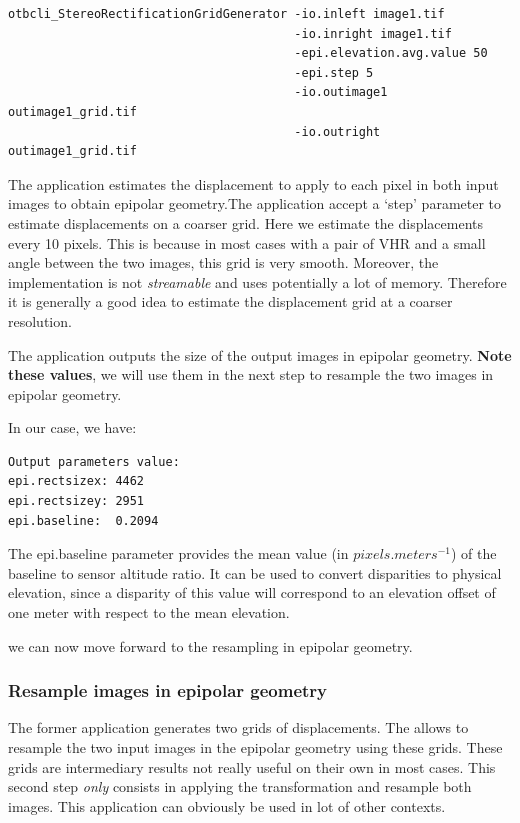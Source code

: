 \begin{verbatim}
otbcli_StereoRectificationGridGenerator -io.inleft image1.tif
                                        -io.inright image1.tif
                                        -epi.elevation.avg.value 50
                                        -epi.step 5
                                        -io.outimage1 outimage1_grid.tif
                                        -io.outright outimage1_grid.tif
\end{verbatim}

The application estimates the displacement to apply to each pixel in
both input images to obtain epipolar geometry.The application accept a
`step' parameter to estimate displacements on a coarser grid. Here we
estimate the displacements every 10 pixels. This is because in most
cases with a pair of VHR and a small angle between the two images,
this grid is very smooth. Moreover, the implementation is
not \textit{streamable} and uses potentially a lot of
memory. Therefore it is generally a good idea to estimate the
displacement grid at a coarser resolution.

The application outputs the size of the output images in epipolar
geometry. \textbf{Note these values}, we will use them in the next step to
resample the two images in epipolar geometry.

In our case, we have:

\begin{verbatim}
Output parameters value:
epi.rectsizex: 4462
epi.rectsizey: 2951
epi.baseline:  0.2094
\end{verbatim}

The epi.baseline parameter provides the mean value (in $pixels.meters^{-1}$) of the
baseline to sensor altitude ratio. It can be used to convert disparities to
physical elevation, since a disparity of this value will correspond to an
elevation offset of one meter with respect to the mean elevation.

we can now move forward to the resampling in epipolar geometry.

\subsubsection{Resample images in epipolar geometry}

The former application generates two grids of
displacements. The  allows to
resample the two input images in the epipolar geometry using these
grids. These grids are intermediary results not really useful on their
own in most cases. This second step \textit{only} consists in applying
the transformation and resample both images. This application can
obviously be used in lot of other contexts.

